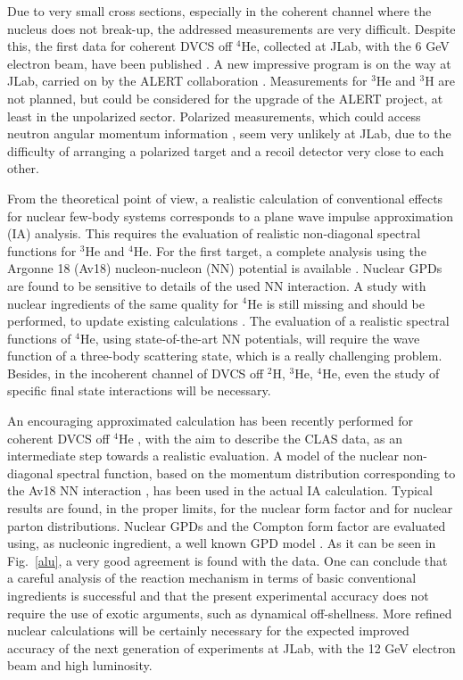 Due to very small cross sections,
especially in the coherent channel where the nucleus does not break-up,
the addressed measurements are very difficult.
Despite this, the first data for coherent DVCS off $^4$He,
collected at JLab, with the 6 GeV electron beam,
have been published \cite{Hattawy:2017woc}.
A new impressive program is on the way at JLab,
carried on by the ALERT collaboration 
\cite{Armstrong:2017wfw,Armstrong:2017zcm,Armstrong:2017zqr}.
Measurements for $^3$He and $^3$H
are not planned, but could be considered
for the upgrade of the ALERT project, at least in the unpolarized 
sector. Polarized measurements, which could
access neutron angular momentum information \cite{Rinaldi:2012pj,
Rinaldi:2012ft,Rinaldi:2014bba}, seem
very unlikely at JLab, due to the difficulty of arranging
a polarized target and a recoil detector very close to each other. 

From the theoretical point of view, a realistic calculation 
of conventional effects for
nuclear few-body systems corresponds to a plane wave impulse approximation 
(IA) analysis. This requires the evaluation of realistic non-diagonal spectral
functions for $^3$He and $^4$He.
For the first target, a complete analysis using the Argonne 18 (Av18)
nucleon-nucleon (NN) potential is available
\cite{Scopetta:2004kj,Scopetta:2009sn,Rinaldi:2012pj,
Rinaldi:2012ft,Rinaldi:2014bba}.
Nuclear GPDs are found to be sensitive to details of 
the used NN interaction.
A study with nuclear ingredients of the same quality
for $^4$He is still missing and should be performed, to update 
existing calculations \cite{Guzey:2003jh,Liuti:2005gi}. 
The evaluation of a realistic spectral functions of $^4$He,
using state-of-the-art NN potentials,
will require the wave function of a three-body scattering state, 
which is a really challenging problem.
Besides, in the incoherent channel of DVCS off $^2$H, $^3$He, $^4$He,
even the study of specific final state interactions will be necessary.

An encouraging approximated calculation has been recently
performed for coherent DVCS off $^4$He \cite{PhysRevC.98.015203}, with the aim to
describe the CLAS data, as an intermediate
step towards a realistic evaluation.
A model of the nuclear non-diagonal spectral function, 
based on the momentum distribution
corresponding to the Av18 NN interaction
\cite{PhysRevC.67.034003}, has been used in the 
actual IA
calculation. Typical results
are found, in the proper limits, for the nuclear form factor
and for nuclear parton distributions.
Nuclear GPDs and the
Compton form factor are evaluated using, as nucleonic ingredient,
a well known GPD model \cite{Goloskokov:2011rd}. 
As it can be seen in Fig.~\ref{alu}, a very good agreement 
is found with the data.  
One can conclude that 
a careful analysis of the reaction mechanism in terms of
basic conventional ingredients is successful and that
the present experimental accuracy does not require
the use of exotic arguments, such as dynamical off-shellness.
More refined nuclear calculations will be certainly necessary for 
the expected improved accuracy of the next generation of experiments 
at JLab, with the 12 GeV electron beam and high luminosity. 

